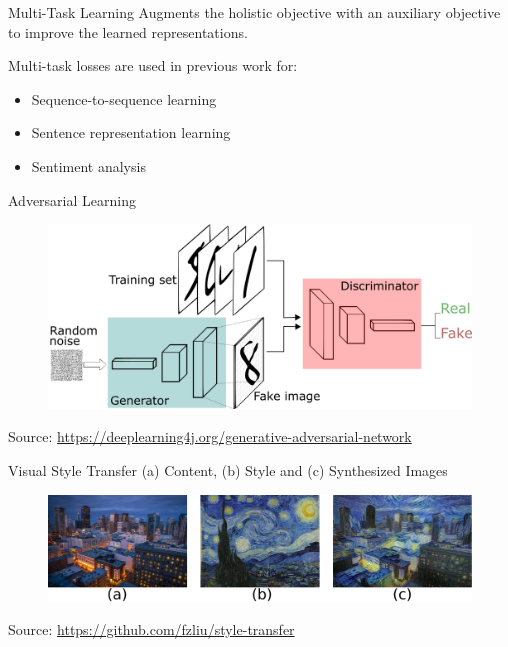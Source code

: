 \documentclass[aspectratio=169]{beamer}
\newcommand{\imgsrc}[1]{\tiny{Source: #1}}
\begin{document}
\begin{frame}{Multi-Task Learning}
	Augments the holistic objective with an auxiliary objective to improve the learned representations.

	Multi-task losses are used in previous work for:
	\begin{itemize}
		\item Sequence-to-sequence learning \citep{luong2015multi}
		\item Sentence representation learning \citep{jernite2017discourse}
		\item Sentiment analysis \citep{balikas2017multitask}
	\end{itemize}
\end{frame}

\begin{frame}{Adversarial Learning}
	\centering
	\begin{figure}[ht]
		\includegraphics[width=\textwidth]{images/gans}
	\end{figure}
	\imgsrc{\url{https://deeplearning4j.org/generative-adversarial-network}}
\end{frame}

\begin{frame}{Visual Style Transfer}
	\centering
	(a) Content, (b) Style and (c) Synthesized Images
	\begin{figure}[ht]
		\includegraphics[width=\textwidth]{images/style-transfer-vision}
	\end{figure}
	\imgsrc{\url{https://github.com/fzliu/style-transfer}}
\end{frame}
\end{document}
